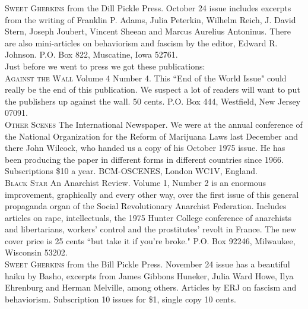 \noindent\textsc{Sweet Gherkins} from the Dill Pickle Press. October 24 issue includes excerpts from the writing of Franklin P. Adams, Julia Peterkin, Wilhelm Reich, J. David Stern, Joseph Joubert, Vincent Sheean and Marcus Aurelius Antoninus. There are also mini-articles on behaviorism and fascism by the editor, Edward R. Johnson. P.O. Box 822, Muscatine, Iowa 52761.\\

\noindent Just before we went to press we got these publications:\\

\noindent\textsc{Against the Wall} Volume 4 Number 4. This ``End of the World Issue" could really be the end of this publication. We suspect a lot of readers will want to put the publishers up against the wall. 50 cents. P.O. Box 444, Westfield, New Jersey 07091.\\

\noindent\textsc{Other Scenes} The International Newspaper. We were at the annual conference of the National Organization for the Reform of Marijuana Laws last December and there John Wilcock, who handed us a copy of his October 1975 issue. He has been producing the paper in different forms in different countries since 1966. Subscriptions \$10 a year. BCM-OSCENES, London WC1V, England.\\

\noindent\textsc{Black Star} An Anarchist Review. Volume 1, Number 2 is an enormous improvement, graphically and every other way, over the first issue of this general propaganda organ of the Social Revolutionary Anarchist Federation. Includes articles on rape, intellectuals, the 1975 Hunter College conference of anarchists and libertarians, workers' control and the prostitutes' revolt in France. The new cover price is 25 cents ``but take it if you're broke." P.O. Box 92246, Milwaukee, Wisconsin 53202.\\

\noindent\textsc{Sweet Gherkins} from the Bill Pickle Press. November 24 issue has a beautiful haiku by Basho, excerpts from James Gibbons Huneker, Julia Ward Howe, Ilya Ehrenburg and Herman Melville, among others. Articles by ERJ on fascism and behaviorism. Subscription 10 issues for \$1, single copy 10 cents.
